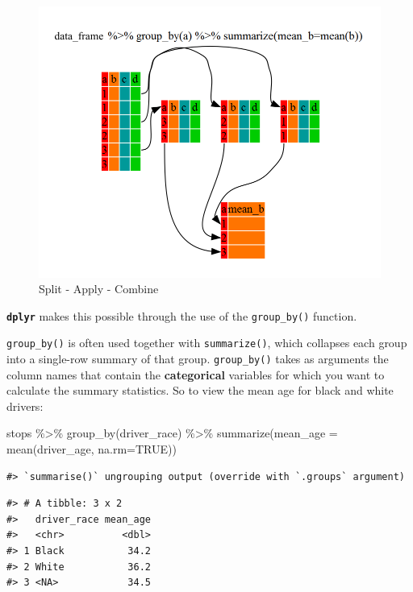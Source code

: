 \documentclass[
]{book}
\newenvironment{Shaded}{\begin{snugshade}}{\end{snugshade}}
\newcommand{\AttributeTok}[1]{\textcolor[rgb]{0.77,0.63,0.00}{#1}}
\newcommand{\ConstantTok}[1]{\textcolor[rgb]{0.00,0.00,0.00}{#1}}
\newcommand{\FunctionTok}[1]{\textcolor[rgb]{0.00,0.00,0.00}{#1}}
\newcommand{\NormalTok}[1]{#1}
\newcommand{\SpecialCharTok}[1]{\textcolor[rgb]{0.00,0.00,0.00}{#1}}
\begin{document}
\begin{figure}
\includegraphics[width=\textwidth]{img/split-apply-combine} \caption{Split - Apply - Combine}\label{fig:split-apply-combine}
\end{figure}

\textbf{\texttt{dplyr}} makes this possible through the use of the \texttt{group\_by()} function.

\texttt{group\_by()} is often used together with \texttt{summarize()}, which collapses each
group into a single-row summary of that group. \texttt{group\_by()} takes as arguments
the column names that contain the \textbf{categorical} variables for which you want
to calculate the summary statistics. So to view the mean age for black and white drivers:

\begin{Shaded}
\begin{Highlighting}[]
\NormalTok{stops }\SpecialCharTok{\%\textgreater{}\%}
  \FunctionTok{group\_by}\NormalTok{(driver\_race) }\SpecialCharTok{\%\textgreater{}\%}
  \FunctionTok{summarize}\NormalTok{(}\AttributeTok{mean\_age =} \FunctionTok{mean}\NormalTok{(driver\_age, }\AttributeTok{na.rm=}\ConstantTok{TRUE}\NormalTok{))}
\end{Highlighting}
\end{Shaded}

\begin{verbatim}
#> `summarise()` ungrouping output (override with `.groups` argument)
\end{verbatim}

\begin{verbatim}
#> # A tibble: 3 x 2
#>   driver_race mean_age
#>   <chr>          <dbl>
#> 1 Black           34.2
#> 2 White           36.2
#> 3 <NA>            34.5
\end{verbatim}
\end{document}
